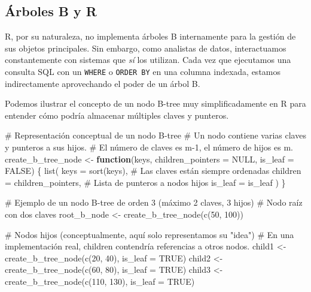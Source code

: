\documentclass[
  spanish,
  letterpaper,
  DIV=11,
  numbers=noendperiod]{scrreprt}
\newenvironment{Shaded}{\begin{snugshade}}{\end{snugshade}}
\newcommand{\AttributeTok}[1]{\textcolor[rgb]{0.40,0.45,0.13}{#1}}
\newcommand{\CommentTok}[1]{\textcolor[rgb]{0.37,0.37,0.37}{#1}}
\newcommand{\ConstantTok}[1]{\textcolor[rgb]{0.56,0.35,0.01}{#1}}
\newcommand{\ControlFlowTok}[1]{\textcolor[rgb]{0.00,0.23,0.31}{\textbf{#1}}}
\newcommand{\DecValTok}[1]{\textcolor[rgb]{0.68,0.00,0.00}{#1}}
\newcommand{\FunctionTok}[1]{\textcolor[rgb]{0.28,0.35,0.67}{#1}}
\newcommand{\NormalTok}[1]{\textcolor[rgb]{0.00,0.23,0.31}{#1}}
\newcommand{\OtherTok}[1]{\textcolor[rgb]{0.00,0.23,0.31}{#1}}
\begin{document}
\subsection{Árboles B y R}\label{uxe1rboles-b-y-r}

R, por su naturaleza, no implementa árboles B internamente para la
gestión de sus objetos principales. Sin embargo, como analistas de
datos, interactuamos constantemente con sistemas que \emph{sí} los
utilizan. Cada vez que ejecutamos una consulta SQL con un \texttt{WHERE}
o \texttt{ORDER\ BY} en una columna indexada, estamos indirectamente
aprovechando el poder de un árbol B.

Podemos ilustrar el concepto de un nodo B-tree muy simplificadamente en
R para entender cómo podría almacenar múltiples claves y punteros.

\begin{Shaded}
\begin{Highlighting}[]
\CommentTok{\# Representación conceptual de un nodo B{-}tree}
\CommentTok{\# Un nodo contiene varias claves y punteros a sus hijos.}
\CommentTok{\# El número de claves es m{-}1, el número de hijos es m.}
\NormalTok{create\_b\_tree\_node }\OtherTok{\textless{}{-}} \ControlFlowTok{function}\NormalTok{(keys, }\AttributeTok{children\_pointers =} \ConstantTok{NULL}\NormalTok{, }\AttributeTok{is\_leaf =} \ConstantTok{FALSE}\NormalTok{) \{}
  \FunctionTok{list}\NormalTok{(}
    \AttributeTok{keys =} \FunctionTok{sort}\NormalTok{(keys), }\CommentTok{\# Las claves están siempre ordenadas}
    \AttributeTok{children =}\NormalTok{ children\_pointers, }\CommentTok{\# Lista de punteros a nodos hijos}
    \AttributeTok{is\_leaf =}\NormalTok{ is\_leaf}
\NormalTok{  )}
\NormalTok{\}}

\CommentTok{\# Ejemplo de un nodo B{-}tree de orden 3 (máximo 2 claves, 3 hijos)}
\CommentTok{\# Nodo raíz con dos claves}
\NormalTok{root\_b\_node }\OtherTok{\textless{}{-}} \FunctionTok{create\_b\_tree\_node}\NormalTok{(}\FunctionTok{c}\NormalTok{(}\DecValTok{50}\NormalTok{, }\DecValTok{100}\NormalTok{))}

\CommentTok{\# Nodos hijos (conceptualmente, aquí solo representamos su "idea")}
\CommentTok{\# En una implementación real, \textquotesingle{}children\textquotesingle{} contendría referencias a otros nodos.}
\NormalTok{child1 }\OtherTok{\textless{}{-}} \FunctionTok{create\_b\_tree\_node}\NormalTok{(}\FunctionTok{c}\NormalTok{(}\DecValTok{20}\NormalTok{, }\DecValTok{40}\NormalTok{), }\AttributeTok{is\_leaf =} \ConstantTok{TRUE}\NormalTok{)}
\NormalTok{child2 }\OtherTok{\textless{}{-}} \FunctionTok{create\_b\_tree\_node}\NormalTok{(}\FunctionTok{c}\NormalTok{(}\DecValTok{60}\NormalTok{, }\DecValTok{80}\NormalTok{), }\AttributeTok{is\_leaf =} \ConstantTok{TRUE}\NormalTok{)}
\NormalTok{child3 }\OtherTok{\textless{}{-}} \FunctionTok{create\_b\_tree\_node}\NormalTok{(}\FunctionTok{c}\NormalTok{(}\DecValTok{110}\NormalTok{, }\DecValTok{130}\NormalTok{), }\AttributeTok{is\_leaf =} \ConstantTok{TRUE}\NormalTok{)}


\end{Highlighting}
\end{Shaded}
\end{document}
